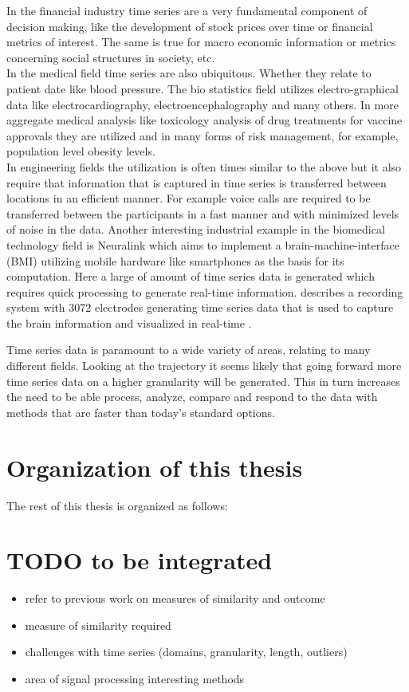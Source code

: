 \documentclass[phd,black, hidelinks]{PrincetonThesis}
\begin{document}
In the financial industry time series are a very fundamental component of decision making, like the development of stock prices over time or financial metrics of interest. The same is true for macro economic information or metrics concerning social structures in society, etc.\\

In the medical field time series are also ubiquitous. Whether they relate to patient date like blood pressure. The bio statistics field utilizes electro-graphical data like electrocardiography, electroencephalography and many others. In more aggregate medical analysis like toxicology analysis of drug treatments for vaccine approvals they are utilized and in many forms of risk management, for example, population level obesity levels.\\

In engineering fields the utilization is often times similar to the above but it also require that information that is captured in time series is transferred between locations in an efficient manner. For example voice calls are required to be transferred between the participants in a fast manner and with minimized levels of noise in the data. Another interesting industrial example in the biomedical technology field is Neuralink which aims to implement a brain-machine-interface (BMI) utilizing mobile hardware like smartphones as the basis for its computation. Here a large of amount of time series data is generated which requires quick processing to generate real-time information. \citeauthor{Musk_2019} describes a recording system with 3072 electrodes generating time series data \cite{Musk_2019} that is used to capture the brain information and visualized in real-time \cite{Siegle_2017}.

Time series data is paramount to a wide variety of areas, relating to many different fields. Looking at the trajectory it seems likely that going forward more time series data on a higher granularity will be generated. This in turn increases the need to be able process, analyze, compare and respond to the data with methods that are faster than today's standard options.


\section{Organization of this thesis}
\label{sec:org85cb8e7}
The rest of this thesis is organized as follows:

\section{{\bfseries\sffamily TODO} to be integrated}
\label{sec:org57c5b76}
\begin{itemize}
\item refer to previous work on measures of similarity and outcome
\item measure of similarity required
\item challenges with time series (domains, granularity, length, outliers)
\item area of signal processing interesting methods
\end{itemize}
\end{document}
